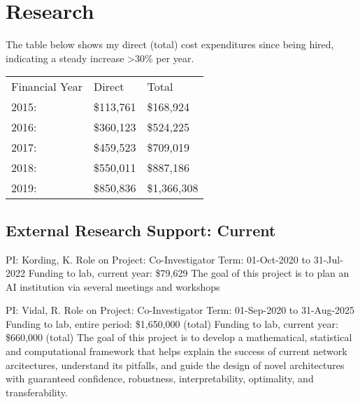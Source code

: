 \documentclass[10pt,colorlinks=true,urlcolor=blue]{moderncv}
\begin{document}
\section{Research}
The table below shows my direct (total) cost expenditures since being hired, indicating a steady increase >30\% per year.\newline \newline

\centering
\begin{tabular}{p{3cm}p{2cm}p{3cm}}
Financial Year & Direct & Total \\
2015: & \$113,761 & \$168,924 \\
2016: & \$360,123 & \$524,225 \\
2017: & \$459,523 & \$709,019 \\
2018: & \$550,011 & \$887,186 \\
2019: & \$850,836 & \$1,366,308
\end{tabular}

\subsection{External Research Support: Current}

{\newline PI: Kording, K.
\newline Role on Project: Co-Investigator
\newline Term: 01-Oct-2020 to 31-Jul-2022
\newline Funding to lab, current year: \$79,629
\newline The goal of this project is to plan an AI institution via several meetings and workshops}{}{}{}

{\newline PI: Vidal, R.
\newline Role on Project: Co-Investigator
\newline Term: 01-Sep-2020 to 31-Aug-2025
\newline Funding to lab, entire period: \$1,650,000 (total)
\newline Funding to lab, current year: \$660,000 (total)
\newline The goal of this project is to develop a mathematical, statistical and computational framework that helps explain the success of current network arcitectures, understand its pitfalls, and guide the
design of novel architectures with guaranteed confidence, robustness, interpretability, optimality, and transferability.}{}{}{}
\end{document}
